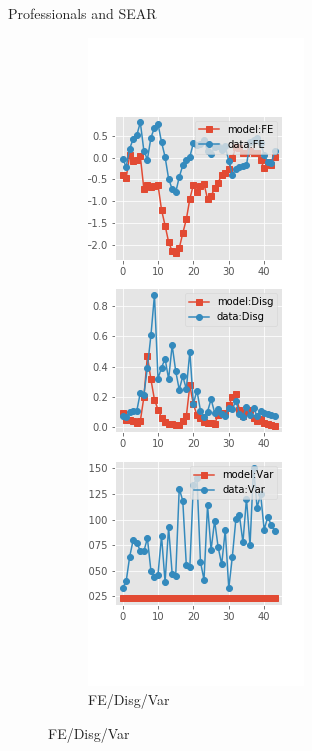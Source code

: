 \documentclass{beamer}
\begin{document}
\begin{frame}{Professionals and SEAR}
\begin{figure}[ht]
\begin{subfigure}[b]{0.2\textwidth}
		\end{subfigure}
		\hfill
		\begin{subfigure}[b]{0.2\textwidth}
			\caption{FE/Disg/Var}
			\includegraphics[width=\textwidth, height = 0.8\textheight]{figuresDraft/spf_se_est_diag3.png}
		\end{subfigure}
		\hfill
	\end{figure}
\end{frame}
\end{document}

